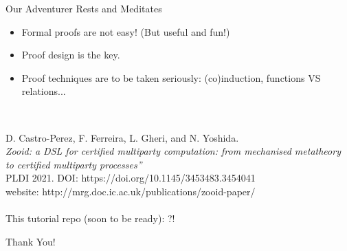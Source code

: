 \documentclass[xcolor={dvipsnames}]{beamer}
\begin{document}
\begin{frame}{Our Adventurer Rests and Meditates}

  \begin{small}

    \begin{itemize}
    \item Formal proofs are not easy! (But useful and fun!)
    \item Proof design is the key.
    \item Proof techniques are to be taken seriously: (co)induction, functions VS relations...
    \end{itemize}

  \end{small}
\ \\

\end{frame}
\begin{frame}
\begin{footnotesize}
  D. Castro-Perez, F. Ferreira, L. Gheri, and N. Yoshida.\\[2mm]
  \emph{Zooid: a DSL for certified multiparty computation: from mechanised metatheory to certified multiparty processes''}\\[2mm]
  PLDI 2021. DOI: https://doi.org/10.1145/3453483.3454041\\
  website: http://mrg.doc.ic.ac.uk/publications/zooid-paper/\\ \ \\


  This tutorial repo (soon to be ready): ?!
\end{footnotesize}

  \begin{center}
    Thank You!
  \end{center}

\end{frame}
\end{document}
